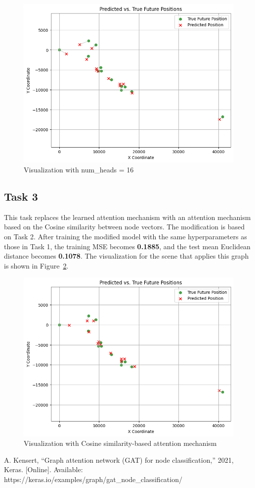 \documentclass[conference]{IEEEtran}
\begin{document}
\begin{figure}[htbp]
    \centering
    \includegraphics[width=0.8\linewidth]{figvisual2.png}
    \caption{Visualization with num\_heads = 16}
    \label{fig:visual2}
\end{figure}

\subsection*{Task 3}

This task replaces the learned attention mechanism with an attention mechanism
based on the Cosine similarity between node vectors. The modification is based
on Task 2. After training the modified model with the same hyperparameters as
those in Task 1, the training MSE becomes \textbf{0.1885}, and the test mean
Euclidean distance becomes \textbf{0.1078}. The visualization for the scene
that applies this graph is shown in Figure~\ref{fig:visual3}.

\begin{figure}[htbp]
    \centering
    \includegraphics[width=0.8\linewidth]{figvisual3.png}
    \caption{Visualization with Cosine similarity-based attention mechanism}
    \label{fig:visual3}
\end{figure}

\begin{thebibliography}{00}
 A. Kensert, “Graph attention network (GAT) for node
    classification,” 2021, Keras. [Online]. Available:
    https://keras.io/examples/graph/gat\_node\_classification/
\end{thebibliography}
\end{document}
